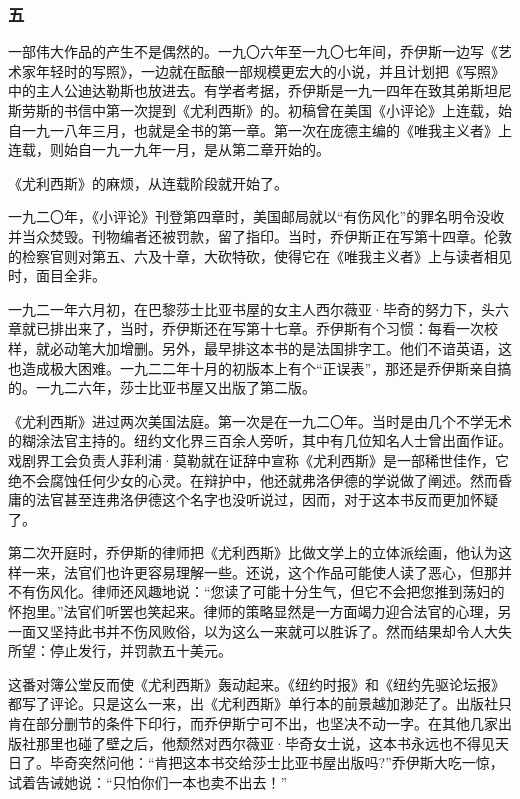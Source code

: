 \subsubsection*{五}
\par 一部伟大作品的产生不是偶然的。一九〇六年至一九〇七年间，乔伊斯一边写《艺术家年轻时的写照》，一边就在酝酿一部规模更宏大的小说，并且计划把《写照》中的主人公迪达勒斯也放进去。有学者考据，乔伊斯是一九一四年在致其弟斯坦尼斯劳斯的书信中第一次提到《尤利西斯》的。初稿曾在美国《小评论》上连载，始自一九一八年三月，也就是全书的第一章。第一次在庞德主编的《唯我主义者》上连载，则始自一九一九年一月，是从第二章开始的。
\par 《尤利西斯》的麻烦，从连载阶段就开始了。
\par 一九二〇年，《小评论》刊登第四章时，美国邮局就以“有伤风化”的罪名明令没收并当众焚毁。刊物编者还被罚款，留了指印。当时，乔伊斯正在写第十四章。伦敦的检察官则对第五、六及十章，大砍特砍，使得它在《唯我主义者》上与读者相见时，面目全非。
\par 一九二一年六月初，在巴黎莎士比亚书屋的女主人西尔薇亚·毕奇的努力下，头六章就已排出来了，当时，乔伊斯还在写第十七章。乔伊斯有个习惯：每看一次校样，就必动笔大加增删。另外，最早排这本书的是法国排字工。他们不谙英语，这也造成极大困难。一九二二年十月的初版本上有个“正误表”，那还是乔伊斯亲自搞的。一九二六年，莎士比亚书屋又出版了第二版。
\par 《尤利西斯》进过两次美国法庭。第一次是在一九二〇年。当时是由几个不学无术的糊涂法官主持的。纽约文化界三百余人旁听，其中有几位知名人士曾出面作证。戏剧界工会负责人菲利浦·莫勒就在证辞中宣称《尤利西斯》是一部稀世佳作，它绝不会腐蚀任何少女的心灵。在辩护中，他还就弗洛伊德的学说做了阐述。然而昏庸的法官甚至连弗洛伊德这个名字也没听说过，因而，对于这本书反而更加怀疑了。
\par 第二次开庭时，乔伊斯的律师把《尤利西斯》比做文学上的立体派绘画，他认为这样一来，法官们也许更容易理解一些。还说，这个作品可能使人读了恶心，但那并不有伤风化。律师还风趣地说：“您读了可能十分生气，但它不会把您推到荡妇的怀抱里。”法官们听罢也笑起来。律师的策略显然是一方面竭力迎合法官的心理，另一面又坚持此书并不伤风败俗，以为这么一来就可以胜诉了。然而结果却令人大失所望：停止发行，并罚款五十美元。
\par 这番对簿公堂反而使《尤利西斯》轰动起来。《纽约时报》和《纽约先驱论坛报》都写了评论。只是这么一来，出《尤利西斯》单行本的前景越加渺茫了。出版社只肯在部分删节的条件下印行，而乔伊斯宁可不出，也坚决不动一字。在其他几家出版社那里也碰了壁之后，他颓然对西尔薇亚·毕奇女士说，这本书永远也不得见天日了。毕奇突然问他：“肯把这本书交给莎士比亚书屋出版吗?”乔伊斯大吃一惊，试着告诫她说：“只怕你们一本也卖不出去！”
